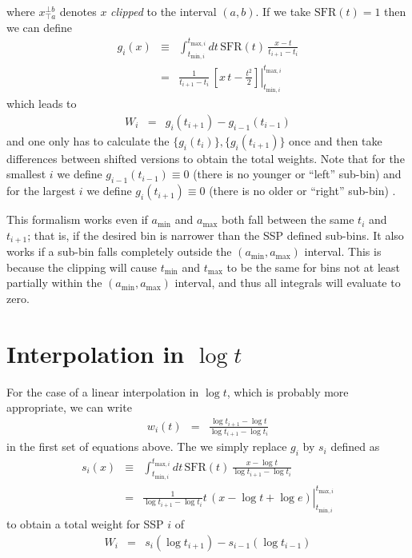 \documentclass[12pt, letterpaper, preprint]{aastex}
\newcommand{\tmin}[1][]{t_{\mathrm{min} #1}}
\newcommand{\tmax}[1][]{t_{\mathrm{max} #1}}
\newcommand{\amin}{a_{\mathrm{min}}}
\newcommand{\amax} {a_{\mathrm{max}}}
\newcommand{\tintegral}{\int_{\tmin[,i]}^{\tmax[,i]} dt}
\newcommand{\tinterval}{\right|_{\tmin[,i]}^{\tmax[,i]}}
\newcommand{\clip}[3][]{{#1}_{\top {#2}}^{\bot {#3}}}
\begin{document}
where $\clip[x]{a}{b}$ denotes $x$ \emph{clipped} to the interval $(a,b)$. If we take $\mathrm{SFR}(t) = 1$ then we can define
\begin{eqnarray}
g_i(x) & \equiv & \tintegral \, \mathrm{SFR}(t) \, \frac{x - t}{t_{i+1}  - t_i} \nonumber  \\
 & = & \left. \frac{1}{t_{i+1} - t_i} \, \left[ x\, t - \frac{t^2}{2} \right] \tinterval
\end{eqnarray}
which leads to
\begin{eqnarray}
W_i & = & g_{i}(t_{i+1}) - g_{i-1}(t_{i-1})
\end{eqnarray}
and one only has to calculate the $\{g_i(t_i)\}, \{g_i(t_{i+1})\}$ once and then take differences between shifted versions to obtain the total weights.
Note that for the smallest $i$ we define $g_{i-1}(t_{i-1})\equiv 0$ (there is no younger or ``left'' sub-bin) 
and for the largest $i$ we define $g_{i}(t_{i+1}) \equiv 0$ (there is no older or ``right'' sub-bin) .

This formalism works even if $\amin$ and $\amax$ both fall between the same $t_i$ and $t_{i+1}$; that is, if the desired bin is narrower than the SSP defined sub-bins.
It also works if a sub-bin falls completely outside the $(\amin, \amax)$ interval.
This is because the clipping will cause $\tmin$ and $\tmax$ to be the same for bins not at least partially within the $(\amin, \amax)$ interval, and thus all integrals will evaluate to zero.

\section{Interpolation in $\log t$}

For the case of a linear interpolation in $\log t$, which is probably more appropriate, we can write
\begin{eqnarray}
w_{i}(t) & = & \frac{ \log t_{i+1} - \log t}{ \log t_{i+1}  - \log t_i} \nonumber
\end{eqnarray}
in the first set of equations above. The we simply replace $g_i$ by $s_i$ defined as 
\begin{eqnarray}
s_i(x) & \equiv & \tintegral \, \mathrm{SFR}(t) \, \frac{x - \log t}{\log t_{i+1}  - \log t_i} \nonumber \\
 & = & \left. \frac{1}{\log t_{i+1} - \log t_i} t \, \left( x - \log t + \log e \right) \tinterval
\end{eqnarray}
to obtain a total weight for SSP $i$ of
\begin{eqnarray}
W_i & = & s_{i}(\log t_{i+1}) - s_{i-1}(\log t_{i-1}) \nonumber
\end{eqnarray}
\end{document}
